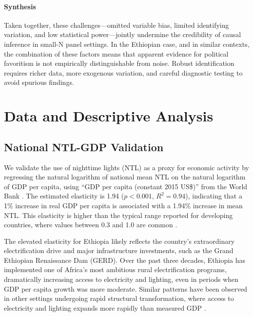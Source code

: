 \documentclass[12pt,a4paper]{article}
\begin{document}
\paragraph{Synthesis}

Taken together, these challenges—omitted variable bias, limited identifying variation, and low statistical power—jointly undermine the credibility of causal inference in small-N panel settings. In the Ethiopian case, and in similar contexts, the combination of these factors means that apparent evidence for political favoritism is not empirically distinguishable from noise. Robust identification requires richer data, more exogenous variation, and careful diagnostic testing to avoid spurious findings.


\section{Data and Descriptive Analysis}

\subsection{National NTL-GDP Validation}

We validate the use of nighttime lights (NTL) as a proxy for economic activity by regressing the natural logarithm of national mean NTL on the natural logarithm of GDP per capita, using “GDP per capita (constant 2015 US\$)” from the World Bank \citep{WorldBank2024}. The estimated elasticity is 1.94 ($p<0.001$, $R^2=0.94$), indicating that a 1\% increase in real GDP per capita is associated with a 1.94\% increase in mean NTL. This elasticity is higher than the typical range reported for developing countries, where values between 0.3 and 1.0 are common \citep{Henderson2012, Gibson2021, Bickenbach2016}.

The elevated elasticity for Ethiopia likely reflects the country’s extraordinary electrification drive and major infrastructure investments, such as the Grand Ethiopian Renaissance Dam (GERD). Over the past three decades, Ethiopia has implemented one of Africa’s most ambitious rural electrification programs, dramatically increasing access to electricity and lighting, even in periods when GDP per capita growth was more moderate. Similar patterns have been observed in other settings undergoing rapid structural transformation, where access to electricity and lighting expands more rapidly than measured GDP \citep{Henderson2012, Gibson2021, Bluhm2022}.
\end{document}
